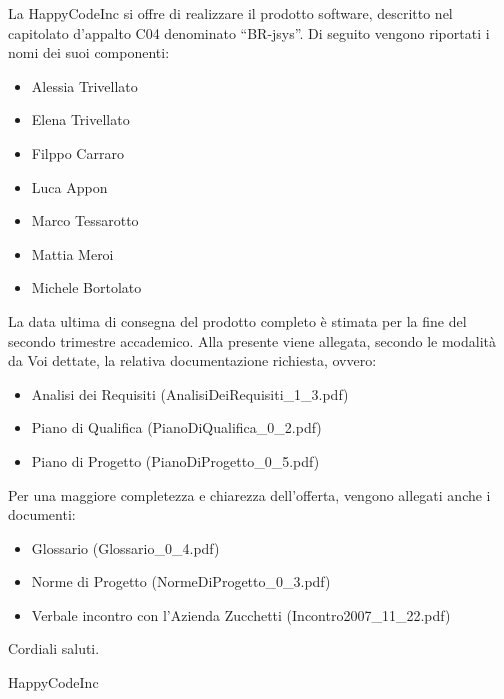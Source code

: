 \documentclass[11pt,titlepage,a4paper]{report}
\begin{document}
La HappyCodeInc si offre di realizzare il prodotto software,
descritto nel capitolato d'appalto C04 denominato ``BR-jsys''.
Di seguito vengono riportati i nomi dei suoi componenti:
\begin{itemize}
\item{}Alessia Trivellato
\item{}Elena Trivellato
\item{}Filppo Carraro
\item{}Luca Appon
\item{}Marco Tessarotto
\item{}Mattia Meroi
\item{}Michele Bortolato
\end{itemize}
La data ultima di consegna del prodotto completo \`e stimata per la fine del
secondo trimestre accademico. Alla presente viene allegata, secondo le modalit\`a da Voi dettate, la relativa
documentazione richiesta, ovvero:
\begin{itemize}
\item{}Analisi dei Requisiti (AnalisiDeiRequisiti\_1\_3.pdf)
\item{}Piano di Qualifica (PianoDiQualifica\_0\_2.pdf)
\item{}Piano di Progetto (PianoDiProgetto\_0\_5.pdf)
\end{itemize}
Per una maggiore completezza e chiarezza dell'offerta, vengono allegati
anche i documenti:
\begin{itemize}
\item{}Glossario (Glossario\_0\_4.pdf)
\item{}Norme di Progetto (NormeDiProgetto\_0\_3.pdf)
\item{}Verbale incontro con l'Azienda Zucchetti (Incontro2007\_11\_22.pdf)
\end{itemize}
Cordiali saluti.
\begin{flushright}
HappyCodeInc
\end{flushright}
\end{document}
